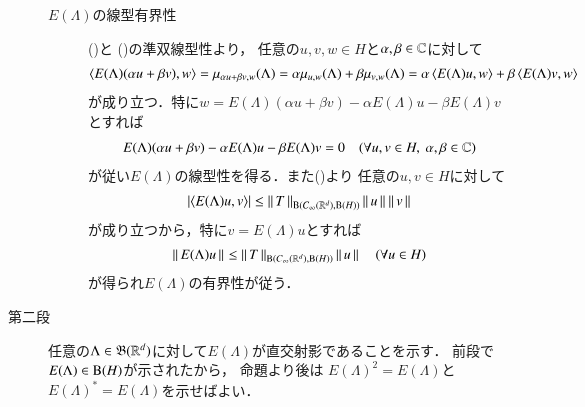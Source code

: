 \begin{prf}
\begin{description}
\begin{description}
					\item[$E(\Lambda)$の線型有界性]
						()と
						()の準双線型性より，
						任意の$u,v,w \in H$と$\alpha,\beta \in \mathbb{C}$に対して
						\begin{align}
							\inprod<E(\Lambda)(\alpha u + \beta v),w>
							= \mu_{\alpha u + \beta v, w}(\Lambda)
							= \alpha \mu_{u,w}(\Lambda) + \beta \mu_{v,w}(\Lambda)
							= \alpha \inprod<E(\Lambda)u,w> + \beta \inprod<E(\Lambda)v,w>
						\end{align}
						が成り立つ．特に$w = E(\Lambda)(\alpha u + \beta v) - \alpha E(\Lambda) u - \beta E(\Lambda) v$とすれば
						\begin{align}
							E(\Lambda)(\alpha u + \beta v) - \alpha E(\Lambda) u - \beta E(\Lambda) v = 0
							\quad (\forall u,v \in H,\ \alpha,\beta \in \mathbb{C})
						\end{align}
						が従い$E(\Lambda)$の線型性を得る．また()より
						任意の$u,v \in H$に対して
						\begin{align}
							\left| \inprod<E(\Lambda)u,v> \right| \leq \Norm{T}{\Bop{\cvan{\R^d}}{\selfBop{H} } } \Norm{u}{} \Norm{v}{}
						\end{align}
						が成り立つから，特に$v = E(\Lambda) u$とすれば
						\begin{align}
							\left\|\, E(\Lambda)u\, \right\|_{} \leq \left\|\, T\, \right\|_{\mathrm{B}(C_\infty (\mathbb{R}^d),\mathrm{B}(H) ) } \left\|\, u\, \right\|_{}
							\quad (\forall u \in H)
						\end{align}
						が得られ$E(\Lambda)$の有界性が従う．
				\end{description}
			
			\item[第二段] 任意の$\Lambda \in \mathfrak{B}(\mathbb{R}^d)$に対して$E(\Lambda)$が直交射影であることを示す．
				前段で$E(\Lambda) \in \mathrm{B}(H) $が示されたから，
				命題\label{prp:orthogonal_projection_idempotent_self_adjoint}より後は
				$E(\Lambda)^2 = E(\Lambda)$と$E(\Lambda)^* = E(\Lambda)$を示せばよい．
				\begin{align}
					
				\end{align}
		\end{description}
	\end{prf}
	